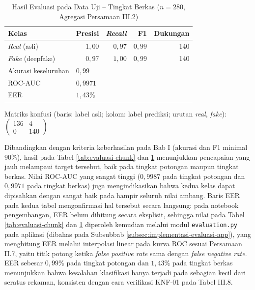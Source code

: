 \begin{table}[htbp]
  \centering
  \caption{Hasil Evaluasi pada Data Uji -- Tingkat Berkas ($n=280$, Agregasi Persamaan III.2)}
  \label{tab:evaluasi-file}
  \begin{tabular}{@{}lrrrr@{}}
    \toprule
    \textbf{Kelas} & \textbf{Presisi} & \textbf{\textit{Recall}} & \textbf{F1} & \textbf{Dukungan} \\
    \midrule
    \textit{Real} (asli) & $1{,}00$ & $0{,}97$ & $0{,}99$ & 140 \\
    \textit{Fake} (deepfake) & $0{,}97$ & $1{,}00$ & $0{,}99$ & 140 \\
    \midrule
    Akurasi keseluruhan & \multicolumn{4}{l}{$0{,}99$} \\
    ROC-AUC & \multicolumn{4}{l}{$0{,}9971$} \\
    EER & \multicolumn{4}{l}{$1{,}43\%$} \\
    \bottomrule
  \end{tabular}

  \vspace{2mm}
  \small Matriks konfusi (baris: label asli; kolom: label prediksi; urutan \textit{real}, \textit{fake}):
  $\begin{pmatrix} 136 & 4 \\ 0 & 140 \end{pmatrix}$
\end{table}

Dibandingkan dengan kriteria keberhasilan pada Bab I (akurasi dan F1 minimal
$90\%$), hasil pada Tabel \ref{tab:evaluasi-chunk} dan \ref{tab:evaluasi-file}
menunjukkan pencapaian yang jauh melampaui target tersebut, baik pada tingkat
potongan maupun tingkat berkas. Nilai ROC-AUC yang sangat tinggi ($0{,}9987$ pada
tingkat potongan dan $0{,}9971$ pada tingkat berkas) juga mengindikasikan bahwa
kedua kelas dapat dipisahkan dengan sangat baik pada hampir seluruh nilai ambang.
Baris EER pada kedua tabel mengonfirmasi hal tersebut secara langsung: pada
notebook pengembangan, EER belum dihitung secara eksplisit, sehingga nilai pada
Tabel \ref{tab:evaluasi-chunk} dan \ref{tab:evaluasi-file} diperoleh kemudian
melalui modul \texttt{evaluation.py} pada aplikasi (dibahas pada Subsubbab
\ref{subsec:implementasi-evaluasi-app}), yang menghitung EER melalui interpolasi
linear pada kurva ROC sesuai Persamaan II.7, yaitu titik potong ketika
\textit{false positive rate} sama dengan \textit{false negative rate}. EER sebesar
$0{,}99\%$ pada tingkat potongan dan $1{,}43\%$ pada tingkat berkas menunjukkan
bahwa kesalahan klasifikasi hanya terjadi pada sebagian kecil dari seratus
rekaman, konsisten dengan cara verifikasi KNF-01 pada Tabel III.8.

